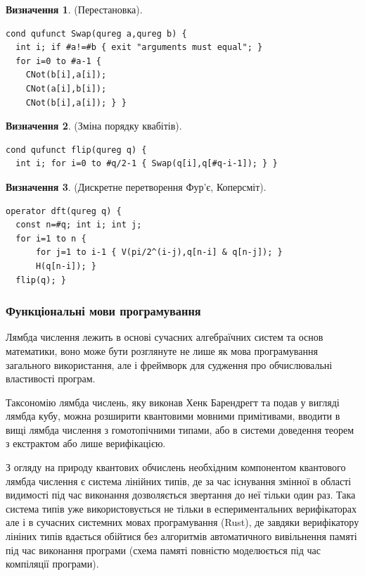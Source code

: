 \documentclass{article}
\theoremstyle{definition}
\newtheorem{definition}{Визначення}
\begin{document}
\begin{definition} (Перестановка).
\begin{lstlisting}
cond qufunct Swap(qureg a,qureg b) {
  int i; if #a!=#b { exit "arguments must equal"; }
  for i=0 to #a-1 {
    CNot(b[i],a[i]);
    CNot(a[i],b[i]);
    CNot(b[i],a[i]); } }
\end{lstlisting}
\end{definition}

\begin{definition} (Зміна порядку квабітів).
\begin{lstlisting}
cond qufunct flip(qureg q) {
  int i; for i=0 to #q/2-1 { Swap(q[i],q[#q-i-1]); } }
\end{lstlisting}
\end{definition}

\begin{definition} (Дискретне перетворення Фур'є, Коперсміт).
\begin{lstlisting}
operator dft(qureg q) {
  const n=#q; int i; int j;
  for i=1 to n {
      for j=1 to i-1 { V(pi/2^(i-j),q[n-i] & q[n-j]); }
      H(q[n-i]); }
  flip(q); }
\end{lstlisting}
\end{definition}

\newpage
\subsubsection{Функціональні мови програмування}
Лямбда числення лежить в основі сучасних алгебраїчних систем та основ математики\cite{HoTT13},
воно може бути розглянуте не лише як мова програмування загального використання, але і
фреймворк для судження про обчислювальні властивості програм.

Таксономію лямбда числень, яку виконав Хенк Барендрегт та подав у вигляді лямбда кубу\cite{Henk93},
можна розширити квантовими мовними примітивами, вводити в вищі лямбда числення з
гомотопічними типами, або в системи доведення теорем з екстрактом або лише верифікацією.

З огляду на природу квантових обчислень необхідним компонентом квантового лямбда
числення є система лінійних типів, де за час існування змінної в області видимості
під час виконання дозволяється звертання до неї тільки один раз. Така система типів
уже використовується не тільки в еспериментальних верифікаторах але і в сучасних
системних мовах програмування (Rust), де завдяки верифікатору лініних типів
вдається обійтися без алгоритмів автоматичного вивільнення памяті під час
виконання програми (схема памяті повністю моделюється під час компіляції програми).
\end{document}

